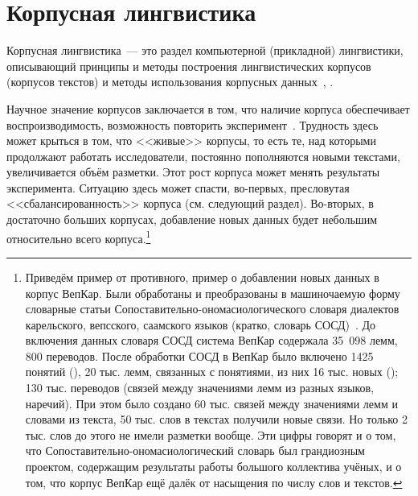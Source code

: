 \section{Корпусная лингвистика} \label{sect_review_corpus_linguistics}

Корпусная лингвистика~--- это раздел компьютерной (прикладной) лингвистики, 
описывающий принципы и методы 
построения лингвистических корпусов (корпусов текстов)
и методы использования корпусных данных~\cite[с.~3]{Zakharov2005}, \cite[с.~407]{Kibrik2019}.

Научное значение корпусов заключается в том, что наличие корпуса обеспечивает воспроизводимость, 
возможность повторить эксперимент~\cite[с.~409]{Kibrik2019}. 
Трудность здесь может крыться в том, что <<живые>> корпусы, 
то есть те, над которыми продолжают работать исследователи, 
постоянно пополняются новыми текстами, увеличивается объём разметки. 
Этот рост корпуса может менять результаты эксперимента. 
Ситуацию здесь может спасти, во-первых, пресловутая <<сбалансированность>> корпуса (см. следующий раздел). 
Во-вторых, в достаточно больших корпусах, добавление новых данных будет небольшим 
относительно всего корпуса.\footnote{%
    Приведём пример от противного, пример о добавлении новых данных в корпус ВепКар. 
    Были обработаны и преобразованы в машиночаемую форму словарные статьи 
    Сопоставительно-ономасиологического словаря диалектов карельского, вепсского, саамского языков (кратко, словарь СОСД)~\cite{SOSD2007}. 
    До включения данных словаря СОСД система ВепКар содержала 35~098 лемм, 800 переводов.
    После обработки СОСД в ВепКар было включено 1425 понятий 
        (), 
    20 тыс. лемм, связанных с понятиями, из них 16 тыс. новых (); 
    130 тыс. переводов (связей между значениями лемм из разных языков, наречий). 
    При этом было создано 60 тыс. связей между значениями лемм и словами из текста, 
    50 тыс. слов в текстах получили новые связи. Но только 2 тыс. слов до этого не имели разметки вообще.
    Эти цифры говорят и о том, что Сопоставительно-ономасиологический словарь был грандиозным проектом, 
    содержащим результаты работы большого коллектива учёных, и о том,
    что корпус ВепКар ещё далёк от насыщения по числу слов и текстов.
}

